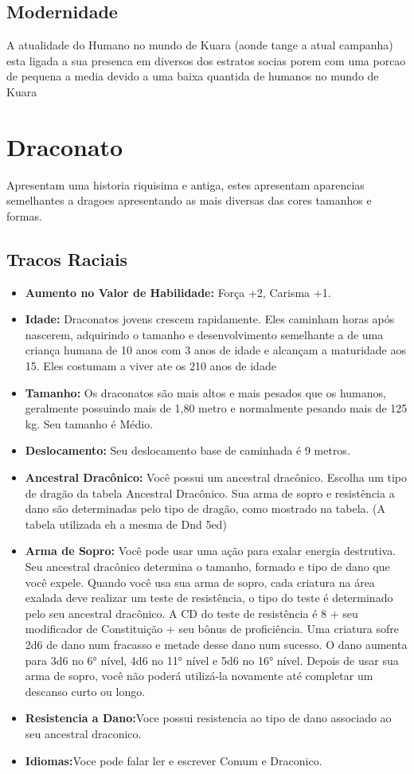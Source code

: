 \documentclass{book}
\begin{document}
\section{Modernidade}
A atualidade do Humano no mundo de Kuara (aonde tange a atual campanha) esta ligada a sua 
presenca em diversos dos estratos socias porem com uma porcao de pequena a media devido a 
uma baixa quantida de humanos no mundo de Kuara 

\chapter{Draconato}
Apresentam uma historia riquisima e antiga, estes apresentam aparencias semelhantes a dragoes 
apresentando as mais diversas das cores tamanhos e formas. 
\section{Tracos Raciais}
\begin{itemize}
     \item \textbf{Aumento no Valor de Habilidade:} Força +2, Carisma +1.
     \item \textbf{Idade:} Draconatos jovens crescem rapidamente. Eles caminham horas após 
      nascerem, adquirindo o tamanho e desenvolvimento semelhante a de uma criança humana
      de 10 anos com 3 anos de idade e alcançam a maturidade aos 15. Eles costumam a viver ate 
      os 210 anos de idade 
     \item \textbf{Tamanho:} Os draconatos são mais altos e mais pesados que os humanos, 
         geralmente possuindo mais de 1,80 metro e normalmente pesando mais de 125 kg. Seu 
         tamanho é Médio.
     \item \textbf{Deslocamento:} Seu deslocamento base de caminhada é 9 metros.
     \item \textbf{Ancestral Dracônico:} Você possui um ancestral dracônico. Escolha um tipo 
         de 
       dragão da tabela Ancestral Dracônico. Sua arma de sopro e resistência a dano são
       determinadas pelo tipo de dragão, como mostrado na tabela.
       (A tabela utilizada eh a mesma de Dnd 5ed)

  \item \textbf{Arma de Sopro:} Você pode usar uma ação para exalar energia destrutiva. Seu 
       ancestral dracônico determina o tamanho, formado e tipo de dano que você
       expele. Quando você usa sua arma de sopro, cada criatura na área exalada deve realizar 
       um teste de resistência, o tipo do teste é determinado pelo seu ancestral 
       dracônico. A CD do teste de resistência é 8 + seu modificador de Constituição + seu   
       bônus de  proficiência. Uma criatura sofre 2d6 de dano num fracasso e metade desse dano 
       num sucesso. O dano aumenta para 3d6 no 6° nível, 4d6 no 11° nível e 5d6 no 16° nível.
       Depois de usar sua arma de sopro, você não poderá utilizá-la novamente até completar um
       descanso curto ou longo.
  \item \textbf{Resistencia a Dano:}Voce possui resistencia ao tipo de dano associado ao seu 
      ancestral draconico.
  \item \textbf{Idiomas:}Voce pode falar ler e escrever Comum e Draconico.
\end{itemize}
\end{document}
